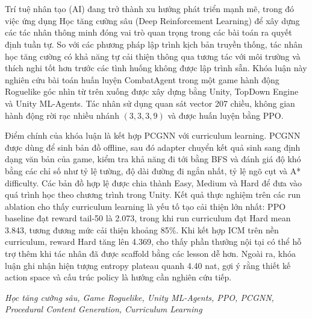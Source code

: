 \clearpage
{}

\chapter*{\fontsize{13}{13}\selectfont{Tóm tắt}}

Trí tuệ nhân tạo (AI) đang trở thành xu hướng phát triển mạnh mẽ, trong đó việc ứng dụng Học tăng cường sâu (Deep Reinforcement Learning) để xây dựng các tác nhân thông minh đóng vai trò quan trọng trong các bài toán ra quyết định tuần tự. So với các phương pháp lập trình kịch bản truyền thống, tác nhân học tăng cường có khả năng tự cải thiện thông qua tương tác với môi trường và thích nghi tốt hơn trước các tình huống không được lập trình sẵn. Khóa luận này nghiên cứu bài toán huấn luyện CombatAgent trong một game hành động Roguelike góc nhìn từ trên xuống được xây dựng bằng Unity, TopDown Engine và Unity ML-Agents. Tác nhân sử dụng quan sát vector 207 chiều, không gian hành động rời rạc nhiều nhánh $(3,3,3,9)$ và được huấn luyện bằng PPO.

Điểm chính của khóa luận là kết hợp PCGNN với curriculum learning. PCGNN được dùng để sinh bản đồ offline, sau đó adapter chuyển kết quả sinh sang định dạng văn bản của game, kiểm tra khả năng đi tới bằng BFS và đánh giá độ khó bằng các chỉ số như tỷ lệ tường, độ dài đường đi ngắn nhất, tỷ lệ ngõ cụt và A* difficulty. Các bản đồ hợp lệ được chia thành Easy, Medium và Hard để đưa vào quá trình học theo chương trình trong Unity. Kết quả thực nghiệm trên các run ablation cho thấy curriculum learning là yếu tố tạo cải thiện lớn nhất: PPO baseline đạt reward tail-50 là 2.073, trong khi run curriculum đạt Hard mean 3.843, tương đương mức cải thiện khoảng 85\%. Khi kết hợp ICM trên nền curriculum, reward Hard tăng lên 4.369, cho thấy phần thưởng nội tại có thể hỗ trợ thêm khi tác nhân đã được scaffold bằng các lesson dễ hơn. Ngoài ra, khóa luận ghi nhận hiện tượng entropy plateau quanh 4.40 nat, gợi ý rằng thiết kế action space và cấu trúc policy là hướng cần nghiên cứu tiếp.

\vspace{0.5cm}
 \textit{Học tăng cường sâu, Game Roguelike, Unity ML-Agents, PPO, PCGNN, Procedural Content Generation, Curriculum Learning}
